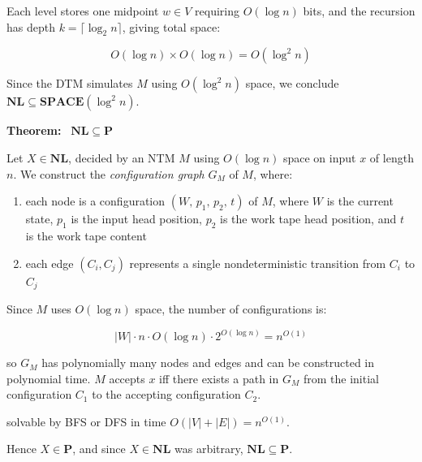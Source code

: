 \documentclass[12pt,a4paper,openany]{article}
\begin{document}
Each level stores one midpoint $w \in V$ requiring $O(\log n)$ bits, and the recursion
has depth $k = \lceil \log_2 n \rceil$, giving total space:

\[
O(\log n) \times O(\log n) = O(\log^2 n)
\]

Since the DTM simulates $M$ using $O(\log^2 n)$ space, we conclude $\mathbf{NL} \subseteq \mathbf{SPACE}(\log^2 n)$.

\bigskip
\textbf{Theorem:} \ $\mathbf{NL} \subseteq \mathbf{P}$

Let $X \in \mathbf{NL}$, decided by an NTM $M$ using $O(\log n)$ space on input $x$ of length $n$.
We construct the \emph{configuration graph} $G_M$ of $M$, where:

\begin{enumerate}
    \item each node is a configuration $(W,\, p_1,\, p_2,\, t)$ of $M$, where $W$ is the
    current state, $p_1$ is the input head position, $p_2$ is the work tape head position,
    and $t$ is the work tape content
    \item each edge $(C_i, C_j)$ represents a single nondeterministic transition from $C_i$ to $C_j$
\end{enumerate}

Since $M$ uses $O(\log n)$ space, the number of configurations is:

\[
|W| \cdot n \cdot O(\log n) \cdot 2^{O(\log n)} = n^{O(1)}
\]

so $G_M$ has polynomially many nodes and edges and can be constructed in polynomial time.
$M$ accepts $x$ iff there exists a path in $G_M$ from the initial configuration $C_1$
to the accepting configuration $C_2$. 

\begin{center}
\end{center}

solvable by BFS or DFS in time $O(|V| + |E|) = n^{O(1)}$.

Hence $X \in \mathbf{P}$, and since $X \in \mathbf{NL}$ was arbitrary, $\mathbf{NL} \subseteq \mathbf{P}$.
\end{document}

